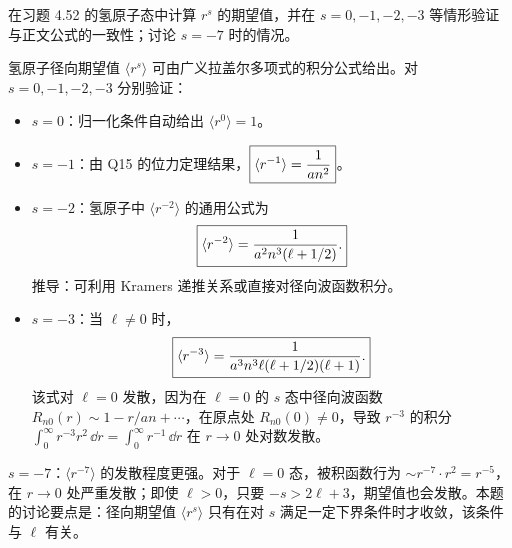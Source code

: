 \begin{question}
在习题 4.52 的氢原子态中计算 $r^s$ 的期望值，并在 $s=0,-1,-2,-3$ 等情形验证与正文公式的一致性；讨论 $s=-7$ 时的情况。
\end{question}
\begin{solution}
氢原子径向期望值 $\langle r^s\rangle$ 可由广义拉盖尔多项式的积分公式给出。对 $s=0,-1,-2,-3$ 分别验证：

\begin{itemize}
\item $s=0$：归一化条件自动给出 $\boxed{\langle r^0\rangle=1}$。
\item $s=-1$：由 Q15 的位力定理结果，$\boxed{\langle r^{-1}\rangle={1\over an^2}}$。
\item $s=-2$：氢原子中 $\langle r^{-2}\rangle$ 的通用公式为
\[
\boxed{\langle r^{-2}\rangle={1\over a^2 n^3(\ell+1/2)}.}
\]
推导：可利用 Kramers 递推关系或直接对径向波函数积分。
\item $s=-3$：当 $\ell\ne0$ 时，
\[
\boxed{\langle r^{-3}\rangle={1\over a^3 n^3\ell(\ell+1/2)(\ell+1)}.}
\]
该式对 $\ell=0$ 发散，因为在 $\ell=0$ 的 $s$ 态中径向波函数 $R_{n0}(r)\sim 1- r/a n + \cdots$，在原点处 $R_{n0}(0)\ne0$，导致 $r^{-3}$ 的积分 $\int_0^\infty r^{-3} r^2\,\dd r = \int_0^\infty r^{-1}\,\dd r$ 在 $r\to0$ 处对数发散。
\end{itemize}

\item $s=-7$：$\langle r^{-7}\rangle$ 的发散程度更强。对于 $\ell=0$ 态，被积函数行为 $\sim r^{-7}\cdot r^2 = r^{-5}$，在 $r\to0$ 处严重发散；即使 $\ell>0$，只要 $-s > 2\ell+3$，期望值也会发散。本题的讨论要点是：径向期望值 $\langle r^s\rangle$ 只有在对 $s$ 满足一定下界条件时才收敛，该条件与 $\ell$ 有关。
\end{solution}


